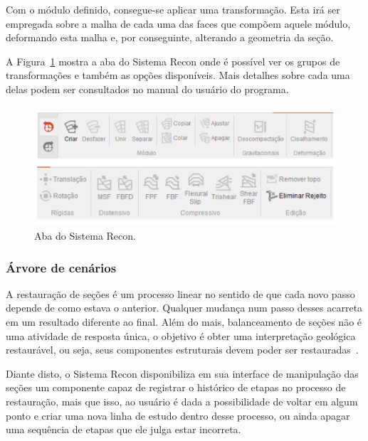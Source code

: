 Com o módulo definido, consegue-se aplicar uma transformação. Esta irá ser empregada sobre a malha de cada uma das faces que compõem aquele módulo, deformando esta malha e, por conseguinte, alterando a geometria da seção.

A Figura~\ref{fig-recon-5} mostra a aba  do Sistema Recon onde é possível ver os grupos de transformações e também as opções disponíveis. Mais detalhes sobre cada uma delas podem ser consultados no manual do usuário do programa\cite{Recon}.

\begin{figure} [H]
  \begin{center}
    \includegraphics[width=\textwidth]{images/fig-recon-5}
    \caption{Aba  do Sistema Recon.}\label{fig-recon-5}
  \end{center}
\end{figure}

\subsubsection{Árvore de cenários}

A restauração de seções é um processo linear no sentido de que cada novo passo depende de como estava o anterior. Qualquer mudança num passo desses acarreta em um resultado diferente ao final. Além do mais, balanceamento de seções não é uma atividade de resposta única, o objetivo é obter uma interpretação geológica restaurável, ou seja, seus componentes estruturais devem poder ser restauradas~\cite{Fossen}. 

Diante disto, o Sistema Recon disponibiliza em sua interface de manipulação das seções um componente capaz de registrar o histórico de etapas no processo de restauração, mais que isso, ao usuário é dada a possibilidade de voltar em algum ponto e criar uma nova linha de estudo dentro desse processo, ou ainda apagar uma sequência de etapas que ele julga estar incorreta.

